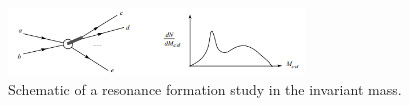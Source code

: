 \begin{figure}[H]
	\centering
	\includegraphics[width=0.7\textwidth]{Images/LHC/invariant_mass_resonance.PNG}
	\caption{Schematic of a resonance formation study in the invariant mass.}
	\label{fig:INVARIANT_MASS_RESONANCE}
\end{figure}

